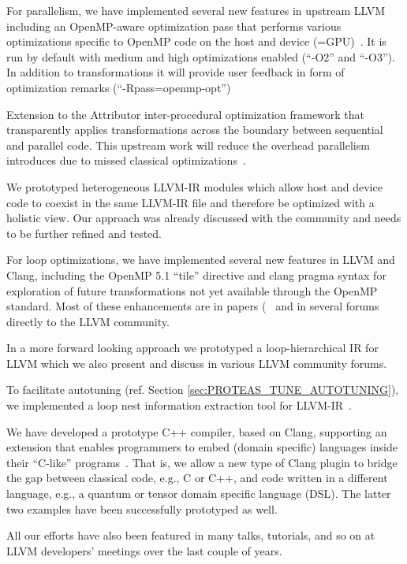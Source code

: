 For parallelism, we have implemented several new features in upstream LLVM
including an OpenMP-aware optimization pass that performs various optimizations
specific to OpenMP code on the host and device (=GPU)~\cite{OpenMPOpt2020}. It
is run by default with medium and high optimizations enabled (``-O2'' and
``-O3''). In addition to transformations it will provide user feedback in form
of optimization remarks (``-Rpass=openmp-opt'')

Extension to the Attributor inter-procedural optimization framework that
transparently applies transformations across the  boundary between sequential
and parallel code. This upstream work will reduce the overhead parallelism
introduces due to missed classical optimizations~\cite{giorgis2020}.

We prototyped heterogeneous LLVM-IR modules which allow host and device code to
coexist in the same LLVM-IR file and therefore be optimized with a holistic
view. Our approach was already discussed with the community and needs to be
further refined and tested.

For loop optimizations, we have implemented several new features in LLVM and
Clang, including the OpenMP 5.1 ``tile'' directive and clang pragma syntax for
exploration of future transformations not yet available through the OpenMP
standard. Most of these enhancements are in papers
(~\cite{kruse2018user,kruse2018loop} and in several forums directly to the LLVM
community.

In a more forward looking approach we prototyped a loop-hierarchical IR for
LLVM which we also present and discuss in various LLVM community forums.

To facilitate autotuning (ref. Section \ref{sec:PROTEAS_TUNE_AUTOTUNING}), we
implemented a loop nest information extraction tool for
LLVM-IR~\cite{kruse2020search}.

We have developed a prototype C++ compiler, based on Clang, supporting an
extension that enables programmers to embed (domain specific) languages inside
their ``C-like'' programs~\cite{finkel2020dsl}. That is, we allow a new type of
Clang plugin to bridge the gap between classical code, e.g., C or C++, and code
written in a different language, e.g., a quantum or tensor domain specific
language (DSL). The latter two examples have been successfully prototyped as
well.

All our efforts have also been featured in many talks, tutorials, and so on at
LLVM developers' meetings over the last couple of years.

